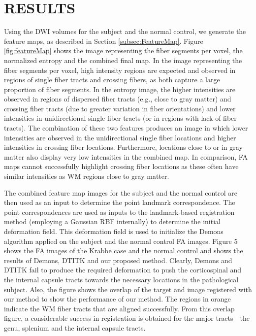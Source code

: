 \documentclass{llncs}
\begin{document}
\section{RESULTS}
Using the DWI volumes for the subject and the normal control, we generate the feature maps, as described in Section \ref{subsec:FeatureMap}. Figure \ref{fig:featureMap} shows the image representing the fiber segments per voxel, the normalized entropy and the combined final map. In the image representing the fiber segments per voxel,  high intensity regions are expected and observed in regions of single fiber tracts and crossing fibers, as both capture a large proportion of fiber segments. In the entropy image, the higher intensities are observed in regions of dispersed fiber tracts (e.g., close to gray matter) and crossing fiber tracts (due to greater variation in fiber orientations) and lower intensities in unidirectional single fiber tracts (or in regions with lack of fiber tracts). The combination of  these two features produces an image in which lower intensities are observed in the unidirectional single fiber locations and higher intensities in crossing fiber locations. Furthermore, locations close to or in gray matter also display very low intensities in the combined map.  In comparison, FA maps cannot successfully highlight crossing fiber locations as these often have similar intensities as WM regions close to gray matter.

The combined feature map images for the subject and the normal control are then used as an input to determine the point landmark correspondence. The point correspondences are used as inputs to the landmark-based registration method (employing a Gaussian RBF internally) to determine the initial deformation field. This deformation field is used to initialize the Demons algorithm applied on the subject and the normal control FA images. Figure 5 shows the FA images of the Krabbe case and the normal control and shows the results of Demons, DTITK and our proposed method. Clearly, Demons and DTITK fail to produce the required deformation to push the corticospinal and the internal capsule tracts towards the necessary locations in the pathological subject. Also, the figure shows the overlap of the target and image registered with our method to show the performance of our method. The regions in orange indicate the WM fiber tracts that are aligned successfully. From this overlap figure, a considerable success in registration is obtained for the major tracts - the genu, splenium and the internal capsule tracts.
\end{document}
